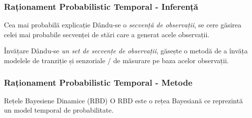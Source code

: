 \begin{frame}
  \frametitle{Raționament Probabilistic Temporal - Inferență}
	\begin{block}{Cea mai probabilă explicație}
		Dându-se o \emph{secvență de observații}, se cere găsirea \alert{celei mai probabile secvenței de stări}
		care a generat acele observații.
	\end{block}
	\pause
	
	\begin{block}{Învățare}
		Dându-se \emph{un set de secvențe de observații}, găsește o metodă de a învăța \alert{modelele} de
		\alert{tranziție} și \alert{senzoriale / de măsurare} pe baza acelor observații.
	\end{block}
\end{frame}

\begin{frame}[t]
    \frametitle{Raționament Probabilistic Temporal - Metode}
    
  	\begin{block}{Rețele Bayesiene Dinamice (RBD)}
  		O RBD este o rețea Bayesiană ce reprezintă un model temporal de probabilitate.
  	\end{block}
  	

\end{frame}
